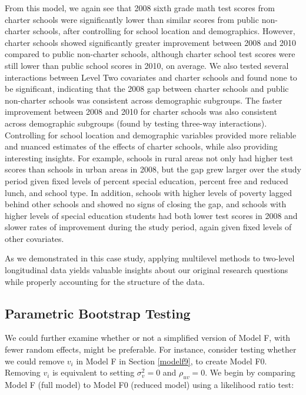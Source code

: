 \documentclass[
]{krantz}
\begin{document}
From this model, we again see that 2008 sixth grade math test scores from charter schools were significantly lower than similar scores from public non-charter schools, after controlling for school location and demographics. However, charter schools showed significantly greater improvement between 2008 and 2010 compared to public non-charter schools, although charter school test scores were still lower than public school scores in 2010, on average. We also tested several interactions between Level Two covariates and charter schools and found none to be significant, indicating that the 2008 gap between charter schools and public non-charter schools was consistent across demographic subgroups. The faster improvement between 2008 and 2010 for charter schools was also consistent across demographic subgroups (found by testing three-way interactions). Controlling for school location and demographic variables provided more reliable and nuanced estimates of the effects of charter schools, while also providing interesting insights. For example, schools in rural areas not only had higher test scores than schools in urban areas in 2008, but the gap grew larger over the study period given fixed levels of percent special education, percent free and reduced lunch, and school type. In addition, schools with higher levels of poverty lagged behind other schools and showed no signs of closing the gap, and schools with higher levels of special education students had both lower test scores in 2008 and slower rates of improvement during the study period, again given fixed levels of other covariates.

As we demonstrated in this case study, applying multilevel methods to two-level longitudinal data yields valuable insights about our original research questions while properly accounting for the structure of the data.

\hypertarget{longitudinal-paraboot}{%
\subsection{Parametric Bootstrap Testing}\label{longitudinal-paraboot}}

We could further examine whether or not a simplified version of Model F, with fewer random effects, might be preferable. For instance, consider testing whether we could remove \(v_i\) in Model F in Section \ref{modelf9}, to create Model F0. Removing \(v_i\) is equivalent to setting \(\sigma_{v}^{2} = 0\) and \(\rho_{uv} = 0\). We begin by comparing Model F (full model) to Model F0 (reduced model) using a likelihood ratio test:
\end{document}

